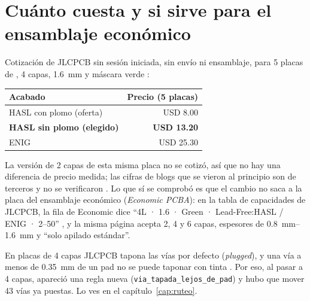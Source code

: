 \section{Cuánto cuesta y si sirve para el ensamblaje económico}\label{sec:c08-costo}

Cotización de JLCPCB sin sesión iniciada, sin envío ni ensamblaje, para 5 placas de ,
4 capas, \SI{1.6}{\milli\meter} y máscara verde :

\begin{center}
\begin{tabular}{@{}lr@{}}
\toprule
\textbf{Acabado} & \textbf{Precio (5 placas)} \\
\midrule
HASL con plomo (oferta) & USD \num{8.00} \\
\textbf{HASL sin plomo (elegido)} & \textbf{USD \num{13.20}} \\
ENIG & USD \num{25.30} \\
\bottomrule
\end{tabular}
\end{center}

La versión de 2 capas de esta misma placa no se cotizó, así que no hay una diferencia de precio medida; las cifras de
blogs que se vieron al principio son de terceros y no se verificaron \copia. Lo que sí se comprobó es que el cambio no
saca a la placa del ensamblaje económico (\emph{Economic PCBA}): en la tabla de capacidades de JLCPCB, la fila de
Economic dice ``4L · 1.6 · Green · Lead-Free:HASL / ENIG · 2--50'' , y la
misma página acepta 2, 4 y 6 capas, espesores de \SIrange{0.8}{1.6}{\milli\meter} y ``solo apilado estándar''.

\begin{ojo}
En placas de 4 capas JLCPCB tapona las vías por defecto (\emph{plugged}), y una vía a menos de \SI{0.35}{\milli\meter}
de un pad no se puede taponar con tinta . Por eso, al pasar a 4 capas,
apareció una regla nueva (\texttt{via\_tapada\_lejos\_de\_pad}) y hubo que mover 43 vías ya puestas. Lo ves en el
capítulo~\ref{cap:ruteo}.
\end{ojo}

